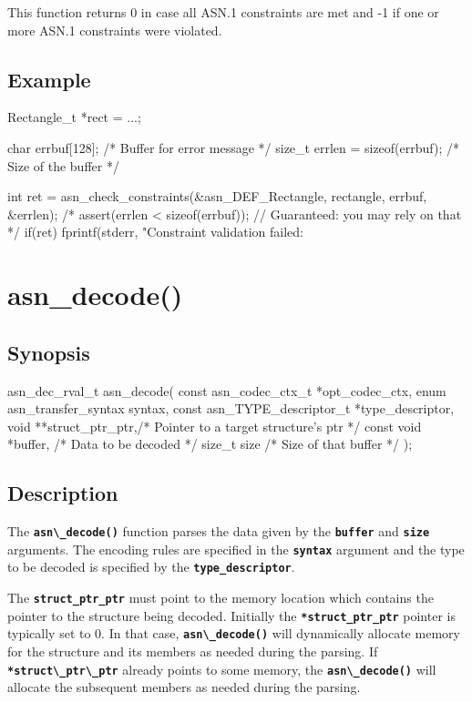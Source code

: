 \documentclass[english,oneside,12pt]{book}
\newcommand{\apisection}[2]{\clearpage\section{\label{#1}#2}}
\newcommand{\code}[1]{\texttt{\textbf{\lstinline{#1}}}}
\begin{document}
This function returns 0 in case all ASN.1 constraints are met
and -1 if one or more ASN.1 constraints were violated.

\subsection*{Example}

\begin{codesample}[basicstyle=\scriptsize\listingfont]
Rectangle_t *rect = ...;

char errbuf[128];  /* Buffer for error message */
size_t errlen = sizeof(errbuf);  /* Size of the buffer */

int ret = asn_check_constraints(&asn_DEF_Rectangle, rectangle, errbuf, &errlen);
/* assert(errlen < sizeof(errbuf)); // Guaranteed: you may rely on that */
if(ret) {
    fprintf(stderr, "Constraint validation failed: %
}
\end{codesample}

\apisection{sec:asn_decode}{asn\_decode()}

\subsection*{Synopsis}
\begin{signature}
asn_dec_rval_t asn_decode(
    const asn_codec_ctx_t *opt_codec_ctx,
    enum asn_transfer_syntax syntax,
    const asn_TYPE_descriptor_t *type_descriptor,
    void **struct_ptr_ptr,/* Pointer to a target structure's ptr */
    const void *buffer,   /* Data to be decoded */
    size_t size           /* Size of that buffer */
);
\end{signature}

\subsection*{Description}

The \code{asn\_decode()} function parses the data given by the \code{buffer}
and \code{size} arguments. The encoding rules are specified in the \code{syntax}
argument and the type to be decoded is specified by the \code{type_descriptor}.

The \code{struct_ptr_ptr} must point to the memory location which contains the
pointer to the structure being decoded. Initially the \code{*struct_ptr_ptr}
pointer is typically set to 0. In that case, \code{asn\_decode()} will
dynamically allocate memory for the structure and its members as needed
during the parsing.
If \code{*struct\_ptr\_ptr} already points to some memory, the \code{asn\_decode()}
will allocate the subsequent members as needed during the parsing.
\end{document}
